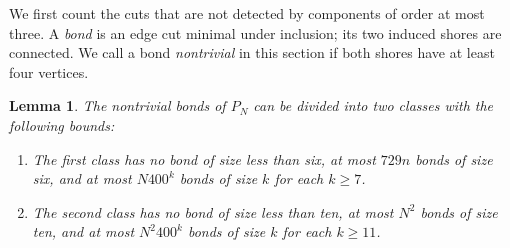 \documentclass[11pt,reqno]{amsart}
\newtheorem{lemma}[theorem]{Lemma}
\theoremstyle{remark}
\numberwithin{equation}{section}
\begin{document}
We first count the cuts that are not detected by components of order
at most three. A \emph{bond} is an edge cut minimal under inclusion;
its two induced shores are connected. We call a bond \emph{nontrivial}
in this section if both shores have at least four vertices.

\begin{lemma}\label{lem:cubic-bonds}
The nontrivial bonds of $P_N$ can be divided into two classes with
the following bounds:
\begin{enumerate}
\item The first class has no bond of size less than six, at most
$729n$ bonds of size six, and at most $N400^k$ bonds of size $k$ for
each $k\ge7$.
\item The second class has no bond of size less than ten, at most
$N^2$ bonds of size ten, and at most $N^2 400^k$ bonds of size $k$ for
each $k\ge11$.
\end{enumerate}
\end{lemma}
\end{document}
